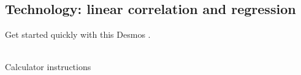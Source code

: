 \subsection{Technology: linear correlation and regression}
\label{calclinreg}

\noindent Get started quickly with this Desmos .
\begin{center}
\end{center}

\noindent \\Calculator instructions

